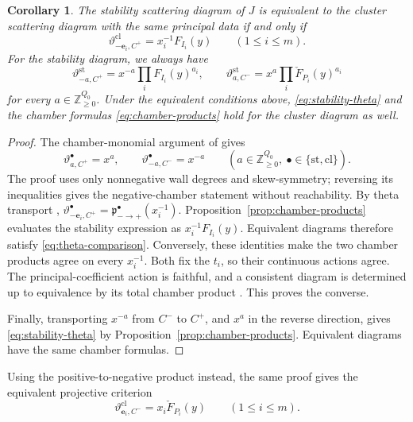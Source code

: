 \documentclass[11pt]{amsart}
\numberwithin{equation}{section}
\newtheorem{corollary}[theorem]{Corollary}
\theoremstyle{definition}
\theoremstyle{remark}
\newcommand{\ZZ}{\mathbb Z}
\begin{document}
\begin{corollary}\label{cor:chamber-theta}
The stability scattering diagram of $J$ is equivalent to the cluster
scattering diagram with the same principal data if and only if
\begin{equation}\label{eq:theta-comparison} \vartheta^{\mathrm{cl}}_{-\mathbf e_i,C^+}=x_i^{-1}F_{I_i}(y)\qquad(1\leq i\leq m).\end{equation}
For the stability diagram, we always have
\begin{equation}\label{eq:stability-theta} \vartheta^{\mathrm{st}}_{-a,C^+}=x^{-a}\prod_iF_{I_i}(y)^{a_i},\qquad \vartheta^{\mathrm{st}}_{a,C^-}=x^a\prod_i\check F_{P_i}(y)^{a_i}\end{equation}
for every $a\in\ZZ_{\geq0}^{Q_0}$. Under the equivalent conditions above,
\eqref{eq:stability-theta} and the chamber formulas
\eqref{eq:chamber-products} hold for the cluster diagram as well.
\end{corollary}

\begin{proof}
The chamber-monomial argument of \cite[Proposition~3.8]{GHKK18} gives
\[ \vartheta^{\bullet}_{a,C^+}=x^a,\qquad \vartheta^{\bullet}_{-a,C^-}=x^{-a}\qquad(a\in\ZZ_{\geq0}^{Q_0},\ \bullet\in\{\mathrm{st},\mathrm{cl}\}). \]
The proof uses only nonnegative wall degrees and skew-symmetry; reversing
its inequalities gives the negative-chamber statement without reachability.
By theta transport \cite[Theorem~3.5]{GHKK18},
$\vartheta^{\bullet}_{-\mathbf e_i,C^+}=\mathfrak p^{\bullet}_{-\to+}(x_i^{-1})$.
Proposition~\ref{prop:chamber-products} evaluates the stability expression
as $x_i^{-1}F_{I_i}(y)$. Equivalent diagrams therefore satisfy
\eqref{eq:theta-comparison}. Conversely, these identities make the two
chamber products agree on every $x_i^{-1}$. Both fix the $t_i$,
so their continuous actions agree. The principal-coefficient action is
faithful, and a consistent diagram is determined up to equivalence by
its total chamber product \cite[Theorem~2.2 and Remark~2.4]{CMQ24}.
This proves the converse.

Finally, transporting $x^{-a}$ from $C^-$ to $C^+$, and
$x^a$ in the reverse direction, gives \eqref{eq:stability-theta}
by Proposition~\ref{prop:chamber-products}. Equivalent diagrams have
the same chamber formulas.
\end{proof}

Using the positive-to-negative product instead, the same proof gives the
equivalent projective criterion
\[ \vartheta^{\mathrm{cl}}_{\mathbf e_i,C^-}=x_i\check F_{P_i}(y)\qquad(1\leq i\leq m). \]
\end{document}
